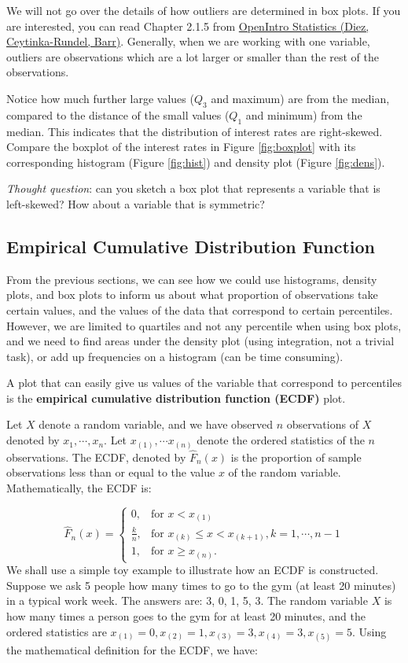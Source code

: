 \documentclass[
]{book}
\begin{document}
We will not go over the details of how outliers are determined in box plots. If you are interested, you can read Chapter 2.1.5 from \href{https://www.openintro.org/book/os/}{OpenIntro Statistics (Diez, Ceytinka-Rundel, Barr)}. Generally, when we are working with one variable, outliers are observations which are a lot larger or smaller than the rest of the observations.

Notice how much further large values (\(Q_3\) and maximum) are from the median, compared to the distance of the small values (\(Q_1\) and minimum) from the median. This indicates that the distribution of interest rates are right-skewed. Compare the boxplot of the interest rates in Figure \ref{fig:boxplot} with its corresponding histogram (Figure \ref{fig:hist}) and density plot (Figure \ref{fig:dens}).

\emph{Thought question}: can you sketch a box plot that represents a variable that is left-skewed? How about a variable that is symmetric?

\hypertarget{ecdf}{%
\subsection{Empirical Cumulative Distribution Function}\label{ecdf}}

From the previous sections, we can see how we could use histograms, density plots, and box plots to inform us about what proportion of observations take certain values, and the values of the data that correspond to certain percentiles. However, we are limited to quartiles and not any percentile when using box plots, and we need to find areas under the density plot (using integration, not a trivial task), or add up frequencies on a histogram (can be time consuming).

A plot that can easily give us values of the variable that correspond to percentiles is the \textbf{empirical cumulative distribution function (ECDF)} plot.

Let \(X\) denote a random variable, and we have observed \(n\) observations of \(X\) denoted by \(x_1, \cdots, x_n\). Let \(x_{(1)}, \cdots x_{(n)}\) denote the ordered statistics of the \(n\) observations. The ECDF, denoted by \(\hat{F}_n(x)\) is the proportion of sample observations less than or equal to the value \(x\) of the random variable. Mathematically, the ECDF is:

\[
 \hat{F}_n(x) = 
  \begin{cases} 
   0, & \text{for } x < x_{(1)} \\
   \frac{k}{n},       & \text{for } x_{(k)} \leq x < x_{(k+1)}, k = 1, \cdots, n-1\\
   1, & \text{for } x \geq x_{(n)}.
  \end{cases}
\]
We shall use a simple toy example to illustrate how an ECDF is constructed. Suppose we ask 5 people how many times to go to the gym (at least 20 minutes) in a typical work week. The answers are: 3, 0, 1, 5, 3. The random variable \(X\) is how many times a person goes to the gym for at least 20 minutes, and the ordered statistics are \(x_{(1)} = 0, x_{(2)} = 1, x_{(3)} = 3, x_{(4)} = 3, x_{(5)} = 5\). Using the mathematical definition for the ECDF, we have:
\end{document}
